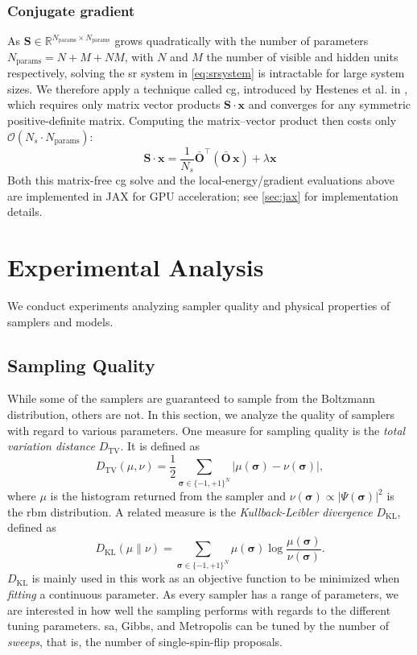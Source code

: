 \documentclass[10pt,a4paper]{article}
\numberwithin{equation}{section}
\begin{document}
\subsubsection{Conjugate gradient}
As $\mathbf{S} \in \mathbb{R}^{N_\text{params} \times N_\text{params}}$ grows quadratically with the number of parameters $N_\text{params} = N + M + NM$, with $N$ and $M$ the number of visible and hidden units respectively, solving the \gls{sr} system in \autoref{eq:srsystem} is intractable for large system sizes. We therefore apply a technique called \gls{cg}, introduced by Hestenes et al. in \cite{Hestenes1952}, which requires only matrix vector products $\mathbf{S} \cdot \mathbf{x}$
and converges for any symmetric positive-definite matrix. Computing the matrix--vector product then costs only $\mathcal{O}(N_s \cdot N_\text{params})$:
\begin{equation}
    \mathbf{S} \cdot \mathbf{x} = \frac{1}{N_s}\bar{\mathbf{O}}^\top(\bar{\mathbf{O}}\,\mathbf{x}) + \lambda \mathbf{x}
\end{equation}
Both this matrix-free \gls{cg} solve and the local-energy/gradient evaluations above are implemented in JAX for GPU acceleration; see \autoref{sec:jax} for implementation details.
\section{Experimental Analysis}
We conduct experiments analyzing sampler quality and physical properties of samplers and models.
\subsection{Sampling Quality}
While some of the samplers are guaranteed to sample from the Boltzmann distribution, others are not. In this section, we analyze the quality of samplers with regard to various parameters.
One measure for sampling quality is the \textit{total variation distance} $D_\mathrm{TV}$. It is defined as
\begin{equation}
      D_{\mathrm{TV}}(\mu, \nu) = \frac{1}{2}\sum_{\boldsymbol{\sigma} \in \{-1,+1\}^N} \left|\mu(\boldsymbol{\sigma}) - \nu(\boldsymbol{\sigma})\right|,
  \end{equation}
where $\mu$ is the histogram returned from the sampler and $\nu(\boldsymbol{\sigma}) \propto |\Psi(\boldsymbol{\sigma})|^2$ is the \gls{rbm} distribution.
A related measure is the \textit{Kullback-Leibler divergence} $D_{\mathrm{KL}}$, defined as
\begin{equation}
      D_{\mathrm{KL}}(\mu \| \nu) = \sum_{\boldsymbol{\sigma} \in \{-1,+1\}^N} \mu(\boldsymbol{\sigma}) \log\frac{\mu(\boldsymbol{\sigma})}{\nu(\boldsymbol{\sigma})}.
  \end{equation}
$D_\mathrm{KL}$ is mainly used in this work as an objective function to be minimized when \textit{fitting} a continuous parameter.
As every sampler has a range of parameters, we are interested in how well the sampling performs with regards to the different tuning parameters. \Gls{sa}, Gibbs, and Metropolis can be tuned by the number of \textit{sweeps}, that is, the number of single-spin-flip proposals.
\end{document}
